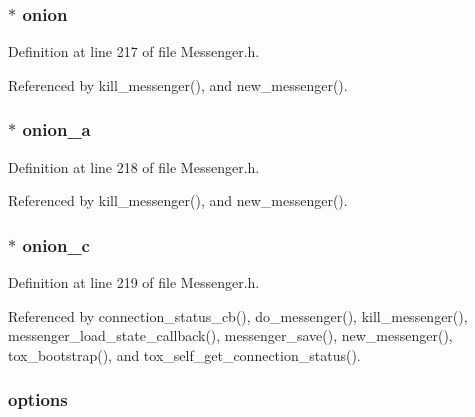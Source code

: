 \hypertarget{struct_messenger_a66fb4bf67c711a5ed3e7bbecec7fde30}{
\subsubsection[{onion}]{$\ast$ onion}}\label{struct_messenger_a66fb4bf67c711a5ed3e7bbecec7fde30}


Definition at line 217 of file Messenger.\+h.



Referenced by kill\+\_\+messenger(), and new\+\_\+messenger().

\hypertarget{struct_messenger_a3a345721fb6be385f4b4519679a4609f}{
\subsubsection[{onion\+\_\+a}]{$\ast$ onion\+\_\+a}}\label{struct_messenger_a3a345721fb6be385f4b4519679a4609f}


Definition at line 218 of file Messenger.\+h.



Referenced by kill\+\_\+messenger(), and new\+\_\+messenger().

\hypertarget{struct_messenger_ae202b81f9a2c2fa80fd310a0996795fc}{
\subsubsection[{onion\+\_\+c}]{$\ast$ onion\+\_\+c}}\label{struct_messenger_ae202b81f9a2c2fa80fd310a0996795fc}


Definition at line 219 of file Messenger.\+h.



Referenced by connection\+\_\+status\+\_\+cb(), do\+\_\+messenger(), kill\+\_\+messenger(), messenger\+\_\+load\+\_\+state\+\_\+callback(), messenger\+\_\+save(), new\+\_\+messenger(), tox\+\_\+bootstrap(), and tox\+\_\+self\+\_\+get\+\_\+connection\+\_\+status().

\hypertarget{struct_messenger_a180dba994d1fff627e19da4179148669}{
\subsubsection[{options}]{ options}}\label{struct_messenger_a180dba994d1fff627e19da4179148669}


